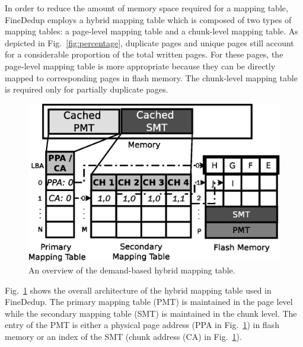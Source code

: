 In order to reduce the amount of memory space required for a mapping table,
FineDedup employs a hybrid mapping table
which is composed of two types of mapping tables:
a page-level mapping table and a chunk-level mapping table.
As depicted in Fig.~\ref{fig:percentage}, 
duplicate pages and unique pages still account for a considerable proportion of the total written pages.
For these pages, the page-level mapping table is more appropriate 
because they can be directly mapped to corresponding pages in flash memory.
The chunk-level mapping table is required only for partially duplicate pages.

\begin{figure}[t]
	\center
	\includegraphics[scale=0.5]{figure/finededup/hybridmapping_1}
	\caption{An overview of the demand-based hybrid mapping table.} %
	\label{fig:hybridmapping}
\end{figure}


Fig.~\ref{fig:hybridmapping} shows the overall architecture of the hybrid mapping table used in FineDedup.
The primary mapping table (PMT) is maintained in the page level 
while the secondary mapping table (SMT) is maintained in the chunk level.
The entry of the PMT is either a physical page address (PPA in Fig.~\ref{fig:hybridmapping}) in flash memory or 
an index of the SMT (chunk address (CA) in Fig.~\ref{fig:hybridmapping}). 

